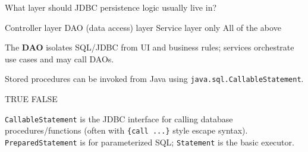 \question[4]
What layer should JDBC persistence logic usually live in?
\begin{choices}
  \choice Controller layer
  \CorrectChoice DAO (data access) layer
  \choice Service layer only
  \choice All of the above
\end{choices}
\begin{solution}
  The \textbf{DAO} isolates SQL/JDBC from UI and business rules; services orchestrate use cases and may call DAOs.
\end{solution}

\newpage


\question[4]
Stored procedures can be invoked from Java using \texttt{java.sql.CallableStatement}.
\begin{choices}
  \CorrectChoice TRUE
  \choice FALSE
\end{choices}
\begin{solution}
  \texttt{CallableStatement} is the JDBC interface for calling database procedures/functions (often with \texttt{\{call ...\}} style escape syntax). \texttt{PreparedStatement} is for parameterized SQL; \texttt{Statement} is the basic executor.
\end{solution}

